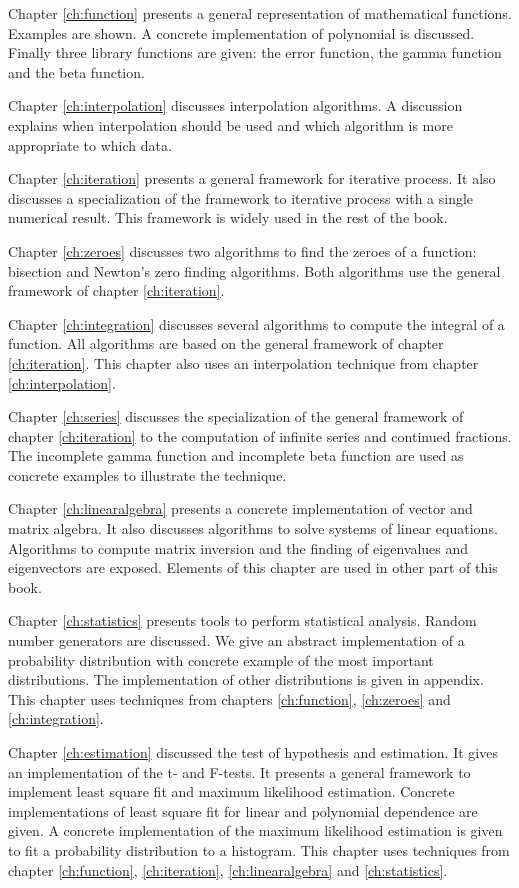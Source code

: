 \documentclass[twoside]{book}
\begin{document}
Chapter \ref{ch:function} presents a general representation of
mathematical functions. Examples are shown. A concrete
implementation of polynomial is discussed. Finally three library
functions are given: the error function, the gamma function and
the beta function.

Chapter \ref{ch:interpolation} discusses interpolation algorithms.
A discussion explains when interpolation should be used and which
algorithm is more appropriate to which data.

Chapter \ref{ch:iteration} presents a general framework for
iterative process. It also discusses a specialization of the
framework to iterative process with a single numerical result.
This framework is widely used in the rest of the book.

Chapter \ref{ch:zeroes} discusses two algorithms to find the
zeroes of a function: bisection and Newton's zero finding
algorithms. Both algorithms use the general framework of chapter
\ref{ch:iteration}.

Chapter \ref{ch:integration} discusses several algorithms to
compute the integral of a function. All algorithms are based on
the general framework of chapter \ref{ch:iteration}. This chapter
also uses an interpolation technique from chapter
\ref{ch:interpolation}.

Chapter \ref{ch:series} discusses the specialization of the
general framework of chapter \ref{ch:iteration} to the computation
of infinite series and continued fractions. The incomplete gamma
function and incomplete beta function are used as concrete
examples to illustrate the technique.

Chapter \ref{ch:linearalgebra} presents a concrete implementation
of vector and matrix algebra. It also discusses algorithms to
solve systems of linear equations. Algorithms to compute matrix
inversion and the finding of eigenvalues and eigenvectors are
exposed. Elements of this chapter are used in other part of this
book.

Chapter \ref{ch:statistics} presents tools to perform statistical
analysis. Random number generators are discussed. We give an
abstract implementation of a probability distribution with
concrete example of the most important distributions. The
implementation of other distributions is given in appendix. This
chapter uses techniques from chapters \ref{ch:function},
\ref{ch:zeroes} and \ref{ch:integration}.

Chapter \ref{ch:estimation} discussed the test of hypothesis and
estimation. It gives an implementation of the t- and F-tests. It
presents a general framework to implement least square fit and
maximum likelihood estimation. Concrete implementations of least
square fit for linear and polynomial dependence are given. A
concrete implementation of the maximum likelihood estimation is
given to fit a probability distribution to a histogram. This
chapter uses techniques from chapter \ref{ch:function},
\ref{ch:iteration}, \ref{ch:linearalgebra} and
\ref{ch:statistics}.
\end{document}
